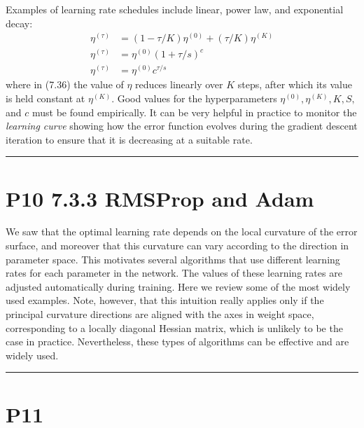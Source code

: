 \documentclass{article}
\begin{document}
Examples of learning rate schedules include linear, power law, and exponential decay:
\begin{align}
\eta^{(\tau)} &= \left(1 - \tau/K\right) \eta^{(0)} + (\tau/K) \eta^{(K)} \tag{7.36} \\
\eta^{(\tau)} &= \eta^{(0)} \left(1 + \tau/s\right)^c \tag{7.37} \\
\eta^{(\tau)} &= \eta^{(0)} c^{\tau/s} \tag{7.38}
\end{align}
where in (7.36) the value of $\eta$ reduces linearly over $K$ steps, after which its value is held constant at $\eta^{(K)}$. Good values for the hyperparameters $\eta^{(0)}, \eta^{(K)}, K, S,$ and $c$ must be found empirically. It can be very helpful in practice to monitor the \emph{learning curve} showing how the error function evolves during the gradient descent iteration to ensure that it is decreasing at a suitable rate.

\noindent\rule{\linewidth}{0.4pt}

\section{P10 7.3.3 RMSProp and Adam}

We saw that the optimal learning rate depends on the local curvature of the error surface, and moreover that this curvature can vary according to the direction in parameter space. This motivates several algorithms that use different learning rates for each parameter in the network. The values of these learning rates are adjusted automatically during training. Here we review some of the most widely used examples. Note, however, that this intuition really applies only if the principal curvature directions are aligned with the axes in weight space, corresponding to a locally diagonal Hessian matrix, which is unlikely to be the case in practice. Nevertheless, these types of algorithms can be effective and are widely used.

\noindent\rule{\linewidth}{0.4pt}

\section{P11}
\end{document}
